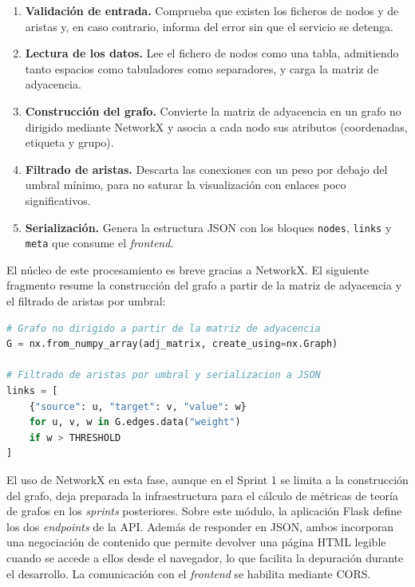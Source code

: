 \begin{enumerate}
	\item \textbf{Validación de entrada.} Comprueba que existen los ficheros de nodos y de aristas y,
		en caso contrario, informa del error sin que el servicio se detenga.
	\item \textbf{Lectura de los datos.} Lee el fichero de nodos como una tabla, admitiendo tanto
		espacios como tabuladores como separadores, y carga la matriz de adyacencia.
	\item \textbf{Construcción del grafo.} Convierte la matriz de adyacencia en un grafo no dirigido
		mediante NetworkX y asocia a cada nodo sus atributos (coordenadas, etiqueta y grupo).
	\item \textbf{Filtrado de aristas.} Descarta las conexiones con un peso por debajo del umbral
		mínimo, para no saturar la visualización con enlaces poco significativos.
	\item \textbf{Serialización.} Genera la estructura JSON con los bloques \texttt{nodes},
		\texttt{links} y \texttt{meta} que consume el \textit{frontend}.
\end{enumerate}

El núcleo de este procesamiento es breve gracias a NetworkX. El siguiente fragmento resume la
construcción del grafo a partir de la matriz de adyacencia y el filtrado de aristas por umbral:

\begin{lstlisting}[language=Python, basicstyle=\footnotesize\ttfamily, keywordstyle=\color{blue!60!black}, commentstyle=\color{gray}, showstringspaces=false, frame=single, columns=fullflexible]
# Grafo no dirigido a partir de la matriz de adyacencia
G = nx.from_numpy_array(adj_matrix, create_using=nx.Graph)

# Filtrado de aristas por umbral y serializacion a JSON
links = [
    {"source": u, "target": v, "value": w}
    for u, v, w in G.edges.data("weight")
    if w > THRESHOLD
]
\end{lstlisting}

El uso de NetworkX en esta fase, aunque en el Sprint 1 se limita a la construcción del grafo, deja
preparada la infraestructura para el cálculo de métricas de teoría de grafos en los \textit{sprints}
posteriores. Sobre este módulo, la aplicación Flask define los dos \textit{endpoints} de la API.
Además de responder en JSON, ambos incorporan una negociación de contenido que permite devolver una
página HTML legible cuando se accede a ellos desde el navegador, lo que facilita la depuración durante
el desarrollo. La comunicación con el \textit{frontend} se habilita mediante CORS.


